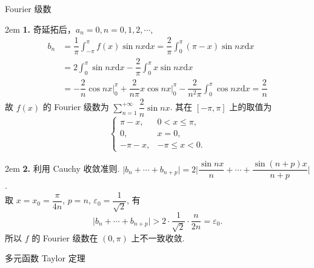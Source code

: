 \documentclass[UTF8,14pt,normal]{ctexart}
\begin{document}
 Fourier 级数
    
    \hangindent 2em
    \noindent
    \textbf{1.} 奇延拓后，\(a_n = 0, n = 0, 1, 2, \cdots\), 
    \begin{align*}
        b_n & = \dfrac{1}{\pi} \int_{- \pi}^{\pi} f(x) \sin nx \mathrm{d} x = \dfrac{2}{\pi} \int_0^{\pi} (\pi - x) \sin nx \mathrm{d} x \\ & = 2 \int_0^{\pi} \sin nx \mathrm{d} x - \dfrac{2}{\pi} \int_0^{\pi} x \sin nx \mathrm{d} x \\ & = -\dfrac{2}{n} \cos nx \bigg|_0^{\pi} + \dfrac{2}{n\pi} x\cos nx \bigg|_0^{\pi} - \dfrac{2}{n^2\pi} \int_0^{\pi} \cos nx \mathrm{d} x = \dfrac{2}{n}
    \end{align*}
    故 \(f(x)\) 的 Fourier 级数为 \(\sum_{n = 1}^{+\infty} \dfrac{2}{n} \sin nx\). 其在 \([- \pi, \pi]\) 上的取值为
    \[
        \begin{cases}
            \pi - x, & 0 < x \leqslant \pi, \\
            0, & x = 0, \\
            - \pi - x, & - \pi \leqslant x < 0.            
        \end{cases}
    \]

    \hangindent 2em
    \noindent
    \textbf{2.} 利用 Cauchy 收敛准则. \(\lvert b_n + \cdots + b_{n + p} \rvert = 2 \lvert \dfrac{\sin nx}{n} + \cdots + \dfrac{\sin (n + p)x}{n + p} \rvert \). \\
    取 \(x = x_0 = \dfrac{\pi}{4n}\), \(p = n\), \(\varepsilon_0 = \dfrac{1}{\sqrt{2}}\), 有
    \[
        \lvert b_n + \cdots + b_{n + p} \rvert > 2 \cdot \dfrac{1}{\sqrt{2}} \cdot \dfrac{n}{2n} = \varepsilon_0.
    \]
    所以 \(f\) 的 Fourier 级数在 \((0, \pi)\) 上不一致收敛.

 多元函数 Taylor 定理
\end{document}
